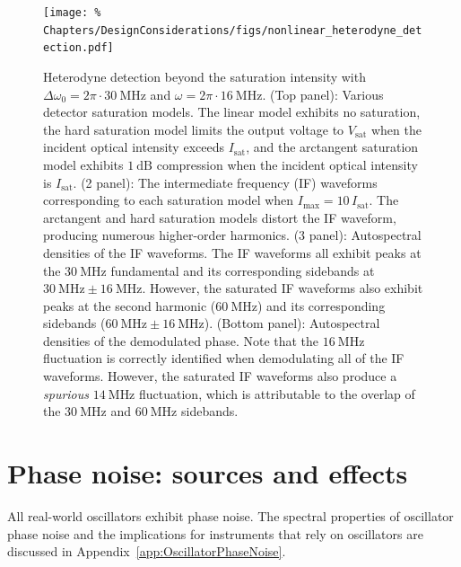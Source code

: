 \begin{figure}
  \centering
  \texttt{[image: \%
    Chapters/DesignConsiderations/figs/nonlinear\_heterodyne\_detection.pdf]}
  \caption[Heterodyne detection beyond the saturation intensity]{%
    Heterodyne detection beyond the saturation intensity with
    $\Delta\omega_0 = 2\pi \cdot \SI{30}{\mega\hertz}$ and
    $\omega = 2 \pi \cdot \SI{16}{\mega\hertz}$.
    (Top panel): Various detector saturation models.
    The linear model exhibits no saturation,
    the hard saturation model limits the output voltage
    to $V_{\text{sat}}$ when the incident optical intensity
    exceeds $I_{\text{sat}}$, and
    the arctangent saturation model exhibits $\SI{1}{\deci\bel}$ compression
    when the incident optical intensity is $I_{\text{sat}}$.
    (2 panel): The intermediate frequency (IF) waveforms
    corresponding to each saturation model when
    $I_{\text{max}} = 10 \, I_{\text{sat}}$.
    The arctangent and hard saturation models distort the IF waveform,
    producing numerous higher-order harmonics.
    (3 panel): Autospectral densities of the IF waveforms.
    The IF waveforms all exhibit peaks at
    the $\SI{30}{\mega\hertz}$ fundamental and
    its corresponding sidebands at
    $\SI{30}{\mega\hertz} \pm \SI{16}{\mega\hertz}$.
    However, the saturated IF waveforms
    also exhibit peaks at the second harmonic ($\SI{60}{\mega\hertz}$)
    and its corresponding sidebands
    ($\SI{60}{\mega\hertz} \pm \SI{16}{\mega\hertz}$).
    (Bottom panel): Autospectral densities of the demodulated phase.
    Note that the $\SI{16}{\mega\hertz}$ fluctuation is correctly identified
    when demodulating all of the IF waveforms.
    However, the saturated IF waveforms also produce
    a \emph{spurious} $\SI{14}{\mega\hertz}$ fluctuation,
    which is attributable to the overlap of
    the $\SI{30}{\mega\hertz}$ and $\SI{60}{\mega\hertz}$ sidebands.
  }
\label{fig:DesignConsiderations:nonlinear_heterodyne_detection}
\end{figure}


\section{Phase noise: sources and effects}
\label{sec:DesignConsiderations:phase_noise}
All real-world oscillators exhibit phase noise.
The spectral properties of oscillator phase noise and
the implications for instruments that rely on oscillators
are discussed in
Appendix~\ref{app:OscillatorPhaseNoise}.


